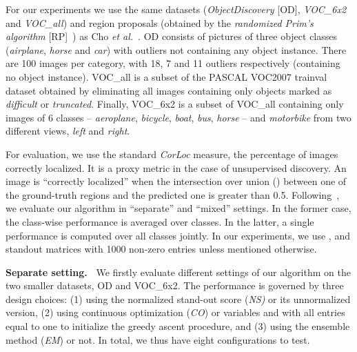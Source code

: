 \documentclass[10pt,twocolumn,letterpaper]{article}
\numberwithin{theorem}{section}
\newcommand{\parag}[1]{\vspace{4pt}\noindent\textbf{#1~}}
\begin{document}
For our experiments we use the same datasets ({\em ObjectDiscovery} [OD],
{\em VOC\_6x2} and {\em VOC\_all}) and region proposals (obtained by
the {\em randomized Prim's algorithm} [RP]~\cite{manen2013prime}) as Cho {\em et al.}~\cite{CKSP15}.  
OD consists of pictures of three object classes (\textit{airplane},
\textit{horse} and \textit{car}) with outliers not containing any
object instance. There are 100 images per category, with 18, 7 and 11
outliers respectively (containing no object instance).
VOC\_all is a subset of the PASCAL VOC2007
trainval dataset obtained by eliminating all images containing only
objects marked as \textit{difficult} or \textit{truncated}. Finally,
VOC\_6x2 is a subset of VOC\_all containing only images of 6
classes -- {\em aeroplane}, {\em bicycle}, {\em boat}, {\em bus}, {\em
  horse} -- and {\em motorbike} from two different views, \textit{left}
and \textit{right}.

For evaluation, we use the standard \textit{CorLoc} measure, the percentage of images
correctly localized. It is a proxy metric in the case of unsupervised discovery.
An image is ``correctly localized'' when the intersection over union () between one
of the ground-truth regions and the predicted one is greater than
0.5. Following~\cite{CKSP15}, we evaluate our algorithm in ``separate'' 
and ``mixed'' settings. In the former case, the class-wise performance is averaged over classes. In the latter, a single performance is computed over all classes jointly. In our experiments, we use ,  and standout matrices with 1000 non-zero entries unless mentioned otherwise.

\parag{Separate setting.}
We firstly evaluate different settings of our
algorithm on the two smaller datasets, OD and VOC\_6x2. The
performance is governed by three design choices: (1) using the normalized stand-out score ({\em NS)} or its unnormalized version, (2) using continuous optimization ({\em CO}) or variables  and  with all entries equal to one to initialize the greedy ascent procedure, and (3) using the ensemble method ({\em EM}) or not. In total, we thus have eight configurations to test.
\end{document}
